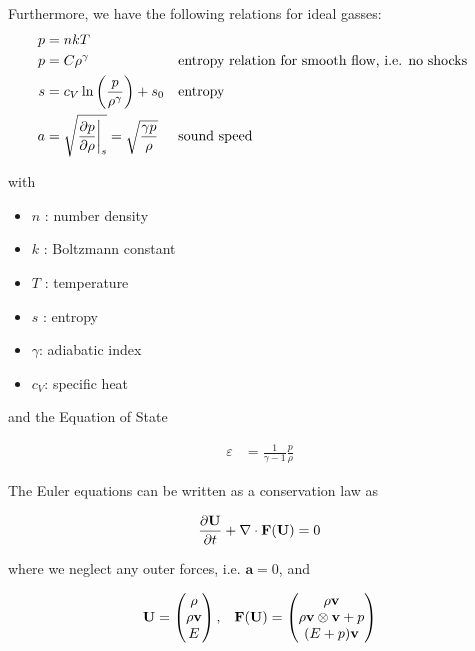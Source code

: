 Furthermore, we have the following relations for ideal gasses:
\begin{align}
	p &= n k T \\
	p &= C \rho ^ \gamma && \text{entropy relation for smooth flow, i.e. no shocks} \\
	s &= c_V \ln \left( \frac{p}{\rho^\gamma} \right) + s_0 && \text{entropy}\\
	a &= \sqrt{\frac{\partial p}{\partial \rho} \bigg{|}_s } = \sqrt{\frac{\gamma p}{\rho}} && \text{sound speed}
\end{align}

with 
\begin{itemize}
	\item $n$ : number density
	\item $k$ : Boltzmann constant
	\item $T$ : temperature
	\item $s$ : entropy
	\item $\gamma$: adiabatic index
	\item $c_V$: specific heat 
\end{itemize}

and the Equation of State

\begin{align}
	\varepsilon &= \frac{1}{\gamma - 1}\frac{p}{\rho}
\end{align}




The Euler equations can be written as a conservation law as

\begin{align}
    \frac{\partial  \mathbf{U} }{\partial t} + \nabla \cdot \mathbf{F}(\mathbf{U}) = 0
\end{align}

where we neglect any outer forces, i.e. $\mathbf{a} = 0$, and 


\begin{align}
	\mathbf{U} = 
		\begin{pmatrix}
			\rho \\ \rho \mathbf{v} \\ E
		\end{pmatrix}, &&
	\mathbf{F}(\mathbf{U}) = 
		\begin{pmatrix}
			\rho \mathbf{v}\\
			\rho \mathbf{v} \otimes \mathbf{v} + p\\
			(E + p) \mathbf{v}
		\end{pmatrix}
\end{align}









